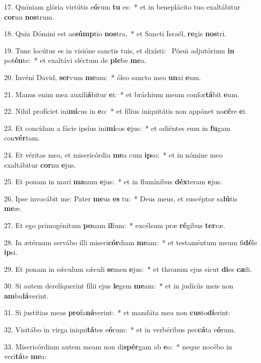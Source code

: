 17. Quóniam glória virtútis e\textbf{ó}rum \textbf{tu} es:~*  et in beneplácito tuo exaltábitur \textbf{cor}nu \textbf{nos}trum.\

18. Quia Dómini est as\textbf{súmp}tio \textbf{nos}tra,~*  et Sancti Israël, \textbf{re}gis \textbf{nos}tri.\

19. Tunc locútus es in visióne sanctis tuis, et dixísti: \dag\  Pósui adjutórium \textbf{in} pot\textbf{én}te:~*  et exaltávi eléctum de \textbf{ple}be \textbf{me}a.\

20. Invéni David, \textbf{ser}vum \textbf{me}um:~*  óleo sancto meo \textbf{un}xi \textbf{e}um.\

21. Manus enim mea auxili\textbf{á}bitur \textbf{e}i:~*  et bráchium meum confor\textbf{tá}bit \textbf{e}um.\

22. Nihil profíciet ini\textbf{mí}cus in \textbf{e}o:~*  et fílius iniquitátis non appónet no\textbf{cé}re \textbf{e}i.\

23. Et concídam a fácie ipsíus ini\textbf{mí}cos \textbf{e}jus:~*  et odiéntes eum in \textbf{fu}gam con\textbf{vér}tam.\

24. Et véritas mea, et misericórdia \textbf{me}a cum \textbf{ip}so:~*  et in nómine meo exaltábitur \textbf{cor}nu \textbf{e}jus.\

25. Et ponam in mari \textbf{ma}num \textbf{e}jus:~*  et in flumínibus \textbf{déx}teram \textbf{e}jus.\

26. Ipse invocábit me: Pater \textbf{me}us \textbf{es} tu:~*  Deus meus, et suscéptor sa\textbf{lú}tis \textbf{me}æ.\

27. Et ego primogénitum \textbf{po}nam \textbf{il}lum:~*  excélsum præ \textbf{ré}gibus \textbf{ter}ræ.\

28. In ætérnum servábo illi miseri\textbf{cór}diam \textbf{me}am:~*  et testaméntum meum fi\textbf{dé}le \textbf{ip}si.\

29. Et ponam in sǽculum sǽculi \textbf{se}men \textbf{e}jus:~*  et thronum ejus sicut \textbf{di}es \textbf{cæ}li.\

30. Si autem derelíquerint fílii ejus \textbf{le}gem \textbf{me}am:~*  et in judíciis meis non \textbf{am}bu\textbf{lá}verint.\

31. Si justítias meas \textbf{pro}fa\textbf{ná}verint:~*  et mandáta mea non \textbf{cus}to\textbf{dí}erint:\

32. Visitábo in virga iniqui\textbf{tá}tes e\textbf{ó}rum:~*  et in verbéribus pec\textbf{cá}ta e\textbf{ó}rum.\

33. Misericórdiam autem meam non di\textbf{spér}gam ab \textbf{e}o:~*  neque nocébo in veri\textbf{tá}te \textbf{me}a:\

